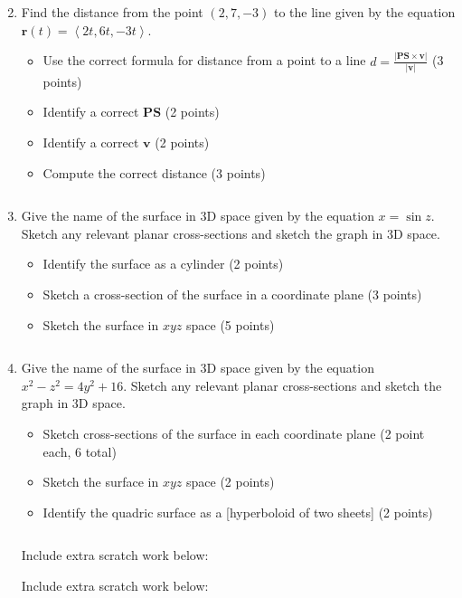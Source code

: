 \documentclass[12pt]{article}
\newcommand{\up}{$~$\vspace*{-0.7in}}
\newcommand{\liner}{\noindent\underline{\hspace*{7in}}}
\renewcommand{\vec}{\mathbf}
\newcommand{\<}{\left<}
\renewcommand{\>}{\right>}
\begin{document}
\begin{enumerate}
\vspace*{7.5in}

\liner
\newpage\up


\item Find the distance from the point $(2,7,-3)$ to the line given by the equation $\vec{r}(t)=\<2t,6t,-3t\>$.

\begin{itemize}
\item Use the correct formula for distance from a point to a line $d = \frac{|\vec{PS}\times\vec{v}|}{|\vec{v}|}$ (3 points)
\item Identify a correct $\vec{PS}$ (2 points) 
\item Identify a correct $\vec{v}$ (2 points) 
\item Compute the correct distance (3 points)
\end{itemize}

\vspace*{7.5in}

\liner
\newpage\up

\item Give the name of the surface in 3D space given by the equation $x=\sin z$. Sketch any relevant planar cross-sections and sketch the graph in 3D space.

\begin{itemize}
\item Identify the surface as a cylinder (2 points) 
\item Sketch a cross-section of the surface in a coordinate plane (3 points) 
\item Sketch the surface in $xyz$ space (5 points)
\end{itemize}

\vspace*{7.5in}

\liner
\newpage\up

\item Give the name of the surface in 3D space given by the equation $x^2-z^2=4y^2+16$. Sketch any relevant planar cross-sections and sketch the graph in 3D space.

\begin{itemize}
\item Sketch cross-sections of the surface in each coordinate plane (2 point each, 6 total) 
\item Sketch the surface in $xyz$ space (2 points) 
\item Identify the quadric surface as a [hyperboloid of two sheets] (2 points)
\end{itemize}

\vspace*{7.5in}

\liner
\newpage\up

\centerline{Include extra scratch work below:}
\liner
\newpage
\centerline{Include extra scratch work below:}
\liner
\newpage

\end{enumerate}
\end{document}
